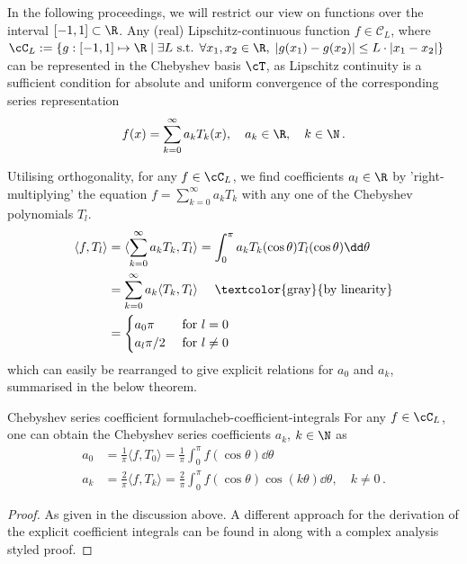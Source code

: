 \documentclass[12pt, a4paper]{article}
\begin{document}
  In the following proceedings, we will restrict our view on functions over the interval $[-1, 1] \subset \R$.
  Any (real) Lipschitz-continuous function $f \in \mathcal{C}_L$, where $\cC_L := \{g: [-1, 1] \mapsto \R \;|\; \exists L \text{ s.t. } \forall x_1, x_2 \in \R, \; |g(x_1) - g(x_2)| \le L \cdot |x_1-x_2|\}$ can be represented in the Chebyshev basis $\cT$, as Lipschitz continuity is a sufficient condition for absolute and uniform convergence of the corresponding series representation
  $$f(x) = \sum_{k=0}^\infty a_k T_k(x), \quad a_k \in \R,\quad k \in \N \,.$$

  Utilising orthogonality, for any $f \in \cC_L$, we find coefficients $a_l \in \R$ by 'right-multiplying' the equation $f = \sum_{k=0}^\infty a_k T_k$ with any one of the Chebyshev polynomials $T_l$.
  \begin{align*}
    \langle f, T_l \rangle & = \langle \sum_{k=0}^\infty a_k T_k, T_l \rangle = \int_0^\pi a_k T_k(\cos \theta) T_l(\cos \theta) \dd\theta \\
                           & = \sum_{k=0}^\infty a_k \langle T_k, T_l \rangle \quad \text{ \textcolor{gray}{by linearity}}                 \\
                           & = \begin{cases}
                                 a_0 \pi   & \text{ for } l = 0    \\
                                 a_l \pi/2 & \text{ for } l \neq 0
                               \end{cases}
  \end{align*}
  which can easily be rearranged to give explicit relations for $a_0$ and $a_k$, summarised in the below theorem.
  \begin{theorem}{Chebyshev series coefficient formula}{cheb-coefficient-integrals}
    For any $f \in \cC_L$, one can obtain the Chebyshev series coefficients $a_k$, $k \in \N$ as
    \begin{align*}
      a_0 & = \frac{1}{\pi} \langle f, T_0 \rangle =  \frac{1}{\pi} \int_0^\pi f(\cos \theta) \dd\theta                                   \\
      a_k & = \frac{2}{\pi} \langle f, T_k \rangle = \frac{2}{\pi} \int_0^\pi f(\cos \theta) \cos(k \theta) \dd\theta, \quad k \neq 0 \,.
    \end{align*}
  \end{theorem}
  \begin{proof}
    As given in the discussion above.
    A different approach for the derivation of the explicit coefficient integrals can be found in \cite{atap} along with a complex analysis styled proof.
  \end{proof}
\end{document}
